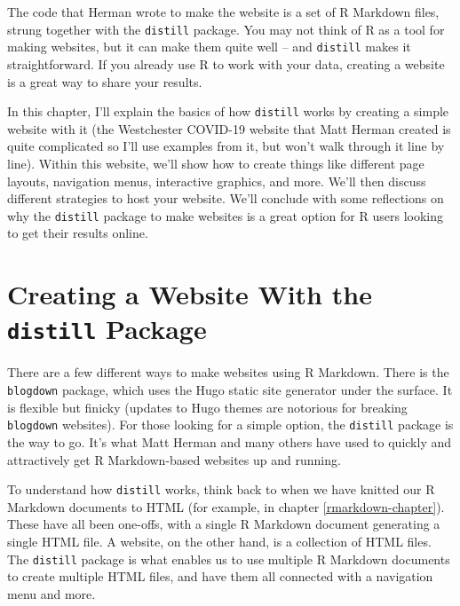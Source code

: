 \documentclass[
]{book}
\begin{document}
The code that Herman wrote to make the website is a set of R Markdown files, strung together with the \texttt{distill} package. You may not think of R as a tool for making websites, but it can make them quite well -- and \texttt{distill} makes it straightforward. If you already use R to work with your data, creating a website is a great way to share your results.

In this chapter, I'll explain the basics of how \texttt{distill} works by creating a simple website with it (the Westchester COVID-19 website that Matt Herman created is quite complicated so I'll use examples from it, but won't walk through it line by line). Within this website, we'll show how to create things like different page layouts, navigation menus, interactive graphics, and more. We'll then discuss different strategies to host your website. We'll conclude with some reflections on why the \texttt{distill} package to make websites is a great option for R users looking to get their results online.

\hypertarget{creating-a-website-with-the-distill-package}{%
\section*{\texorpdfstring{Creating a Website With the \texttt{distill} Package}{Creating a Website With the distill Package}}\label{creating-a-website-with-the-distill-package}}

There are a few different ways to make websites using R Markdown. There is the \texttt{blogdown} package, which uses the Hugo static site generator under the surface. It is flexible but finicky (updates to Hugo themes are notorious for breaking \texttt{blogdown} websites). For those looking for a simple option, the \texttt{distill} package is the way to go. It's what Matt Herman and many others have used to quickly and attractively get R Markdown-based websites up and running.

To understand how \texttt{distill} works, think back to when we have knitted our R Markdown documents to HTML (for example, in chapter \ref{rmarkdown-chapter}). These have all been one-offs, with a single R Markdown document generating a single HTML file. A website, on the other hand, is a collection of HTML files. The \texttt{distill} package is what enables us to use multiple R Markdown documents to create multiple HTML files, and have them all connected with a navigation menu and more.
\end{document}
